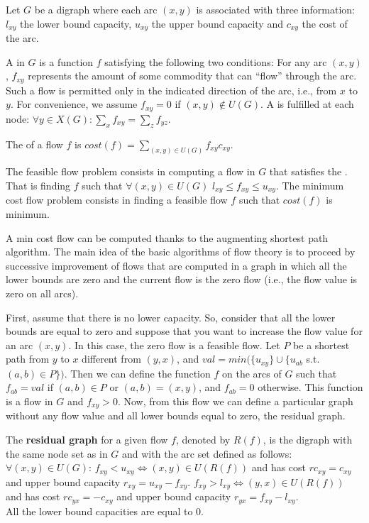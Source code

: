 Let $G$ be a digraph where each arc $(x, y)$ 
is associated with three information: $l_{xy}$ the lower bound capacity, $u_{xy}$ the upper bound capacity and $c_{xy}$ the cost of the arc.

A  in $G$ is a function $f$ satisfying the following two
conditions: 
\point For any arc $(x, y)$, $f_{xy}$ represents the amount
of some commodity that can ``flow'' through the arc. Such a flow is
permitted only in the indicated direction of the arc, i.e., from $x$ to
$y$. For convenience, we assume $f_{xy}=0$ if $(x, y) \not\in
U(G)$.
\point A  is fulfilled at each
node: $\forall y \in X(G) : \sum_{x}f_{xy} = \sum_{z}f_{yz}$.

The  of a flow $f$ is $cost(f)=\sum_{(x, y) \in U(G)}f_{xy}c_{xy}$.

The feasible flow problem consists in computing a flow in $G$ that satisfies the . That is finding $f$ such that $\forall (x, y) \in U(G)$ $l_{xy} \leq f_{xy} \leq u_{xy}$. The minimum cost flow problem consists in finding a feasible flow $f$ such that $cost(f)$ is minimum.

A min cost flow can be computed thanks to the augmenting shortest path algorithm. 
The main idea of the basic algorithms of flow theory is to proceed by
successive improvement of flows that are computed in a graph in which all
the lower bounds are zero and the
current flow is the zero flow (i.e., the flow value is zero on all arcs). 

First, assume that there is no lower capacity.
So, consider that all the lower bounds are equal to zero
and suppose that you want to increase the flow value for an arc $(x, y)$.
In this case, the zero flow is a feasible flow. 
Let $P$ be a shortest path from $y$ to
$x$ different from $(y, x)$, and $val=min(\{u_{xy}\} \cup \{u_{ab}$ s.t. $(a, b) \in P \})$. Then we can define the function $f$ on the arcs
of $G$ such that
$f_{ab}=val$ if $(a, b) \in P$ or $(a, b)=(x, y)$, and $f_{ab}=0$ otherwise. This
function is a flow in $G$ and $f_{xy} >0$. Now, from this flow we can define a particular graph without any flow value and all lower bounds equal to zero, the residual graph.

\begin{definition}
The \textbf{residual graph} for a given flow $f$, denoted by
$R(f)$, is the digraph with the same node set as in $G$ and with the arc set defined as follows:\\ $\forall (x, y) \in U(G)$:
\point $f_{xy} < u_{xy} \Leftrightarrow (x, y) \in U(R(f))$ and has cost
$rc_{xy}=c_{xy}$ and upper bound capacity
$r_{xy}=u_{xy} - f_{xy}$. 
\point $f_{xy} > l_{xy} \Leftrightarrow (y, x) \in U(R(f))$ and has cost
$rc_{yx}=-c_{xy}$ and upper bound capacity
$r_{yx}=f_{xy}-l_{xy}$. \\
All the lower bound capacities are equal to $0$.
\end{definition}

